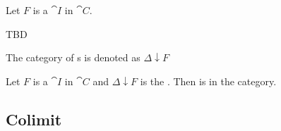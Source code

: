 \begin{definition}
\label{def:category_of_cones}
Let $F$ is a  $\cat{I}$ in $\cat{C}$.

TBD

The category of s is denoted as $\Delta \downarrow
F$ \cite{wiki:cone} 
\end{definition}

\begin{remark}
\label{rem:category_of_cones}
Let $F$ is a  $\cat{I}$ in $\cat{C}$
and $\Delta \downarrow F$ is the .
Then  is  in the
category.
\end{remark}

\subsection{Colimit}

